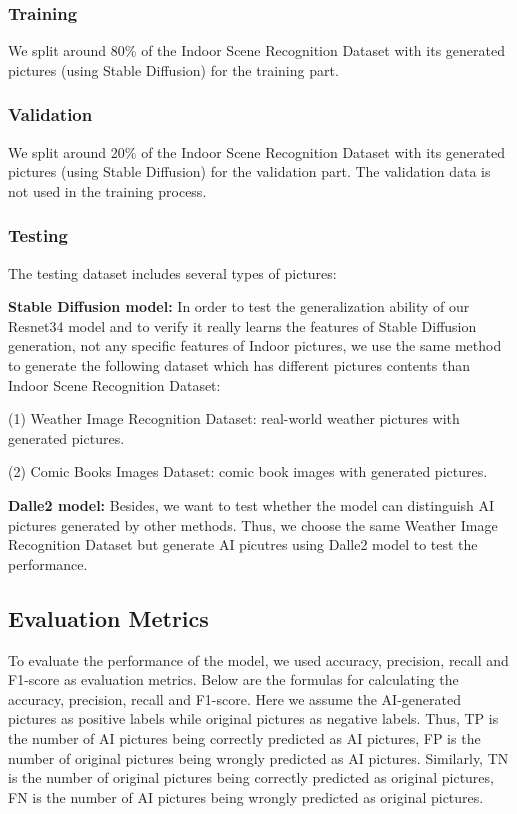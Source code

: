 \documentclass[11pt]{article}
\begin{document}
\subsubsection{Training}

We split around 80\% of the Indoor Scene Recognition Dataset with its generated pictures (using Stable Diffusion) for the training part.

\subsubsection{Validation}

We split around 20\% of the Indoor Scene Recognition Dataset with its generated pictures (using Stable Diffusion) for the validation part. The validation data is not used in the training process.

\subsubsection{Testing}

The testing dataset includes several types of pictures:

\textbf{Stable Diffusion model:} In order to test the generalization ability of our Resnet34 model and to verify it really learns the features of Stable Diffusion generation, not any specific features of Indoor pictures, we use the same method to generate the following dataset which has different pictures contents than Indoor Scene Recognition Dataset:

(1) Weather Image Recognition Dataset: real-world weather pictures with generated pictures.

(2) Comic Books Images Dataset: comic book images with generated pictures.

\textbf{Dalle2 model: } Besides, we want to test whether the model can distinguish AI pictures generated by other methods. Thus, we choose the same Weather Image Recognition Dataset but generate AI picutres using Dalle2 model to test the performance.

\subsection{Evaluation Metrics}

To evaluate the performance of the model, we used accuracy, precision, recall and F1-score as evaluation metrics. Below are the formulas for calculating the accuracy, precision, recall and F1-score. Here we assume the AI-generated pictures as positive labels while original pictures as negative labels. Thus, TP is the number of AI pictures being correctly predicted as AI pictures, FP is the number of original pictures being wrongly predicted as AI pictures. Similarly, TN is the number of original pictures being correctly predicted as original pictures, FN is the number of AI pictures being wrongly predicted as original pictures.
\end{document}
